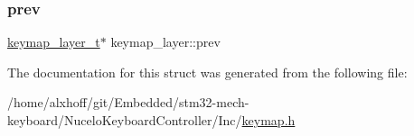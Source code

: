 \subsubsection{\texorpdfstring{prev}{prev}}
{\footnotesize\ttfamily \hyperlink{keymap_8h_a09117a6f418904d4009f63e96c2b9b92}{keymap\+\_\+layer\+\_\+t}$\ast$ keymap\+\_\+layer\+::prev}



The documentation for this struct was generated from the following file\+:\begin{DoxyCompactItemize}
\item 
/home/alxhoff/git/\+Embedded/stm32-\/mech-\/keyboard/\+Nucelo\+Keyboard\+Controller/\+Inc/\hyperlink{keymap_8h}{keymap.\+h}\end{DoxyCompactItemize}
